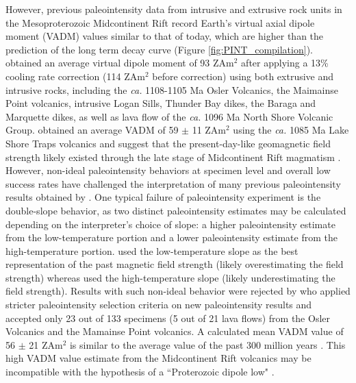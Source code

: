 \documentclass[9pt,twocolumn,twoside,lineno]{pnas-new}
\begin{document}
However, previous paleointensity data from intrusive and extrusive rock units in the Mesoproterozoic Midcontinent Rift \cite{Pesonen1983a, Kulakov2013a, Sprain2018a} record Earth's virtual axial dipole moment (VADM) values similar to that of today, which are higher than the prediction of the long term decay curve (Figure \ref{fig:PINT_compilation}).  obtained an average virtual dipole moment of 93 ZAm$^2$ after applying a 13\% cooling rate correction (114 ZAm$^2$ before correction) using both extrusive and intrusive rocks, including the \textit{ca.} 1108-1105 Ma Osler Volcanics, the Maimainse Point volcanics, intrusive Logan Sills, Thunder Bay dikes, the Baraga and Marquette dikes, as well as lava flow of the \textit{ca.} 1096 Ma North Shore Volcanic Group.  obtained an average VADM of 59 $\pm$ 11 ZAm$^2$ using the \textit{ca.} 1085 Ma Lake Shore Traps volcanics and suggest that the present-day-like geomagnetic field strength likely existed through the late stage of Midcontinent Rift magmatism \cite{Vervoort2007a, Miller2013a}. However, non-ideal paleointensity behaviors at specimen level and overall low success rates have challenged the interpretation of many previous paleointensity results obtained by . One typical failure of paleointensity experiment is the double-slope behavior, as two distinct paleointensity estimates may be calculated depending on the interpreter's choice of slope: a higher paleointensity estimate from the low-temperature portion and a lower paleointensity estimate from the high-temperature portion.  used the low-temperature slope as the best representation of the past magnetic field strength (likely overestimating the field strength) whereas  used the high-temperature slope (likely underestimating the field strength). Results with such non-ideal behavior were rejected by  who applied stricter paleointensity selection criteria on new paleointensity results and accepted only 23 out of 133 specimens (5 out of 21 lava flows) from the Osler Volcanics and the Mamainse Point volcanics. A calculated mean VADM value of 56 $\pm$ 21 ZAm$^2$ is similar to the average value of the past 300 million years \cite{Sprain2018a}. This high VADM value estimate from the Midcontinent Rift volcanics may be incompatible with the hypothesis of a ``Proterozoic dipole low" \cite{Biggin2009a}. 
\end{document}
